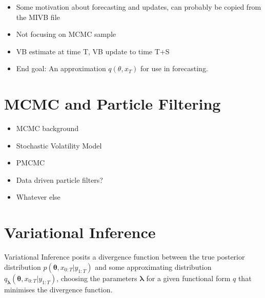 \documentclass[12pt,a4paper]{article}%
\numberwithin{equation}{section}
\begin{document}
\begin{itemize}
\item Some motivation about forecasting and updates, can probably be copied from the MIVB file
\item Not focusing on MCMC sample
\item VB estimate at time T, VB update to time T+S
\item End goal: An approximation $q(\theta, x_{T})$ for use in forecasting.
\end{itemize}

\section{MCMC and Particle Filtering}
\begin{itemize}
\item MCMC background
\item Stochastic Volatility Model
\item PMCMC
\item Data driven particle filters?
\item Whatever else
\end{itemize}

\section{Variational Inference}


Variational Inference posits a divergence function between the true posterior distribution $p(\boldsymbol{\theta}, x_{0:T} | y_{1:T})$ and some approximating distribution $q_{\boldsymbol{\lambda}}(\boldsymbol{\theta}, x_{0:T} | y_{1:T})$, choosing the parameters $\boldsymbol{\lambda}$ for a given functional form $q$ that minimises the divergence function.
\end{document}
